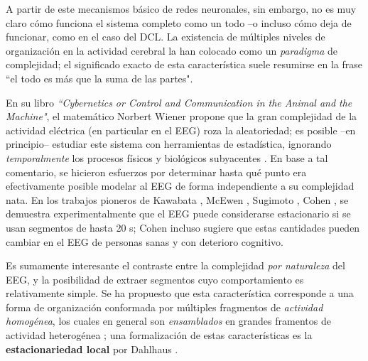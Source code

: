\documentclass[12pt,letterpaper]{book}
\begin{document}
A partir de este mecanismos básico de redes neuronales, sin embargo, no es muy claro cómo funciona el sistema completo como un todo --o incluso cómo deja de funcionar, como en el caso del DCL.
%
La existencia de múltiples niveles de organización en la actividad cerebral la han colocado como un \textit{paradigma} de complejidad;
el significado exacto de esta característica suele resumirse en la frase ``el todo es más que la suma de las partes". %

%
En su libro \textit{``Cybernetics or Control and Communication in the Animal and the Machine"}, el matemático Norbert Wiener 
propone que 
la gran complejidad de la actividad eléctrica (en particular en el EEG) roza la aleatoriedad; es posible --en principio-- estudiar este sistema con herramientas de estadística, ignorando \textit{temporalmente} los procesos físicos y biológicos subyacentes
\cite{wiener61}.
%
En base a tal comentario, se hicieron esfuerzos por determinar hasta qué punto era efectivamente posible modelar al EEG de forma independiente a su complejidad nata.
%
En los trabajos pioneros de Kawabata \cite{Kawabata73}, McEwen \cite{McEwen75}, Sugimoto \cite{Sugimoto78}, Cohen \cite{Cohen77}, se demuestra experimentalmente que el EEG puede considerarse estacionario si se usan segmentos de hasta 20 s; Cohen incluso sugiere que estas cantidades pueden cambiar en el EEG de personas sanas y con deterioro cognitivo.

Es sumamente interesante el contraste entre la complejidad \textit{por naturaleza} del EEG, y la posibilidad de extraer segmentos cuyo comportamiento es relativamente simple.
%
Se ha propuesto que esta característica corresponde a una forma de organización conformada por múltiples fragmentos de \textit{actividad homogénea}, los cuales en general son \textit{ensamblados} en grandes framentos de actividad heterogénea  \cite{kaplan2000application}; 
una formalización de estas características es la \textbf{estacionariedad local} por Dahlhaus \cite{Dahlhaus97}.
\end{document}
